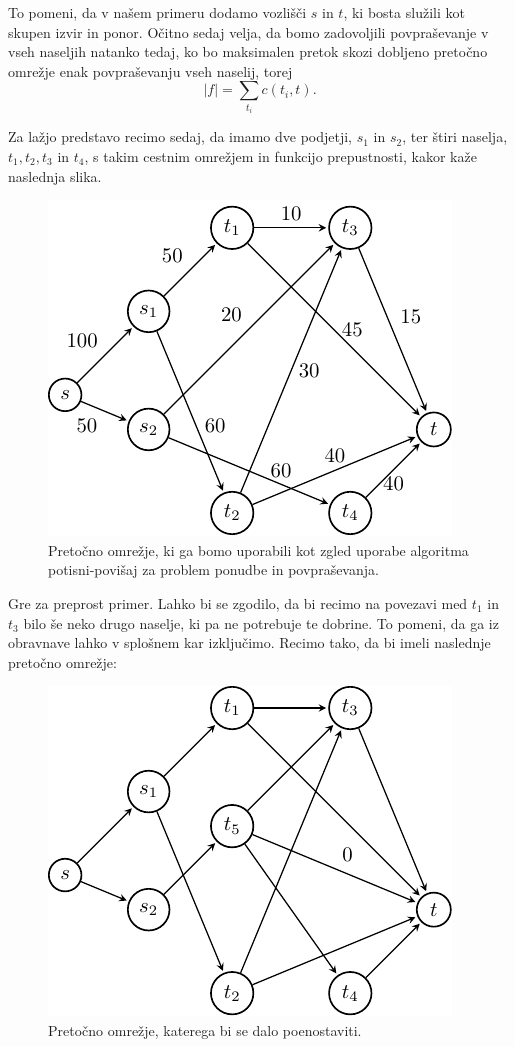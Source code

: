 \documentclass[mat1]{fmfdelo}
\begin{document}
To pomeni, da v našem primeru dodamo vozlišči $s$ in $t$, ki bosta služili kot skupen izvir in ponor. Očitno sedaj velja, da bomo zadovoljili povpraševanje v vseh naseljih natanko tedaj, ko bo
maksimalen pretok skozi dobljeno pretočno omrežje enak povpraševanju vseh naselij, torej \[ |f| = \sum_{t_i} c(t_i, t). \]

Za lažjo predstavo recimo sedaj, da imamo dve podjetji, $s_1$ in $s_2$, ter štiri naselja, $t_1, t_2, t_3$ in $t_4$, s takim cestnim omrežjem in funkcijo prepustnosti, kakor kaže
naslednja slika.

\begin{figure}[H]
  \centering
  \includegraphics{images/primer1-1.pdf}
  \caption{Pretočno omrežje, ki ga bomo uporabili kot zgled uporabe algoritma potisni-povišaj za problem ponudbe in povpraševanja.}
\end{figure}

Gre za preprost primer. Lahko bi se zgodilo, da bi recimo na povezavi med $t_1$ in $t_3$ bilo še neko drugo naselje, ki pa ne potrebuje te dobrine. To pomeni,
da ga iz obravnave lahko v splošnem kar izključimo. Recimo tako, da bi imeli naslednje pretočno omrežje:

\begin{figure}[H]
  \centering
  \includegraphics{images/primer1-2.pdf}
  \caption{Pretočno omrežje, katerega bi se dalo poenostaviti.}
\end{figure}
\end{document}
